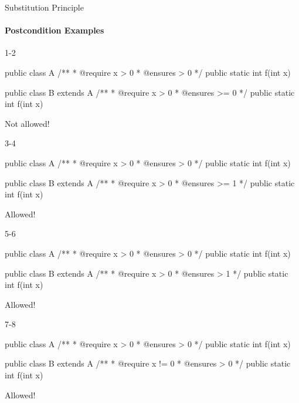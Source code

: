 \documentclass[week11]{csse2002}
\begin{document}
\begin{topic}{Substitution Principle}
\framesubtitle{Postcondition Examples}

\begin{subtopic}{1-2}
\begin{java}
public class A {
	/**
	 * @require x > 0
	 * @ensures \result > 0
	 */
	public static int f(int x) {}
}

public class B extends A {
	/**
	 * @require x > 0
	 * @ensures \result >= 0
	 */
	public static int f(int x) {}
}
\end{java}
\end{subtopic}

\begin{subtopic}{2}
Not allowed!
\end{subtopic}

\begin{subtopic}{3-4}
\begin{java}
public class A {
	/**
	 * @require x > 0
	 * @ensures \result > 0
	 */
	public static int f(int x) {}
}

public class B extends A {
	/**
	 * @require x > 0
	 * @ensures \result >= 1
	 */
	public static int f(int x) {}
}
\end{java}
\end{subtopic}

\begin{subtopic}{4}
Allowed!
\end{subtopic}

\begin{subtopic}{5-6}
\begin{java}
public class A {
	/**
	 * @require x > 0
	 * @ensures \result > 0
	 */
	public static int f(int x) {}
}

public class B extends A {
	/**
	 * @require x > 0
	 * @ensures \result > 1
	 */
	public static int f(int x) {}
}
\end{java}
\end{subtopic}

\begin{subtopic}{6}
Allowed!
\end{subtopic}

\begin{subtopic}{7-8}
\begin{java}
public class A {
	/**
	 * @require x > 0
	 * @ensures \result > 0
	 */
	public static int f(int x) {}
}

public class B extends A {
	/**
	 * @require x != 0
	 * @ensures \result > 0
	 */
	public static int f(int x) {}
}
\end{java}
\end{subtopic}

\begin{subtopic}{8}
Allowed!
\end{subtopic}
\end{topic}
\end{document}
